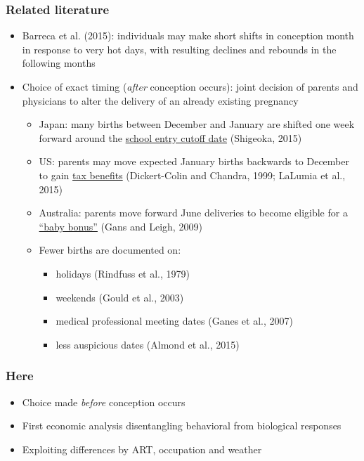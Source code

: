 \documentclass[10pt,letterpaper,subeqn]{beamer}
\begin{document}
\begin{frame}
\frametitle{Related literature}
\begin{itemize}
\item Barreca et al. (2015): individuals may make short shifts in conception month in response to very hot days, with resulting declines and rebounds in the following months
\item Choice of exact timing (\emph{after} conception occurs): joint decision of parents and physicians to alter the delivery of an already existing pregnancy
\begin{itemize}
\item Japan: many births between December and January are shifted one week forward around the \underline{school entry cutoff date} (Shigeoka, 2015)
\item US: parents may move expected January births backwards to December to gain \underline{tax benefits} (Dickert-Colin and Chandra, 1999; LaLumia et al., 2015)
\item Australia: parents move forward June deliveries to become eligible for a \underline{``baby bonus''} (Gans and Leigh, 2009)
\item Fewer births are documented on:
\begin{itemize}
\item holidays (Rindfuss et al., 1979)
\item weekends (Gould et al., 2003)
\item medical professional meeting dates (Ganes et al., 2007)
\item less auspicious dates (Almond et al., 2015)
\end{itemize}
\end{itemize}
\end{itemize}
\end{frame}

\begin{frame}
\frametitle{Here}
\begin{itemize}
\item Choice made \emph{before} conception occurs
\item First economic analysis disentangling behavioral from biological responses
\item Exploiting differences by ART, occupation and weather
\end{itemize}
\end{frame}
\end{document}
